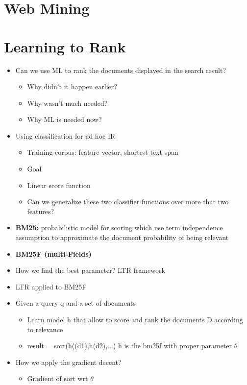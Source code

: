 \chapter{Web Mining}

\chapter{Learning to Rank}
\begin{itemize}
    \item Can we use ML to rank the documents displayed in the search result?
    \begin{itemize}
        \item Why didn't it happen earlier?
        \item Why wasn't much needed?
        \item Why ML is needed now?
    \end{itemize}
    \item Using classification for ad hoc IR
    \begin{itemize}
        \item Training corpus: feature vector, shortest text span
        \item Goal
        \item Linear score function
        \item Can we generalize these two classifier functions over more that two features?
    \end{itemize}
    \item \textbf{BM25:} probabilistic model for scoring which use term independence assumption to approximate the document probability of being relevant
    \item \textbf{BM25F (multi-Fields)}
    \item How we find the best parameter? LTR framework
    \item LTR applied to BM25F
    \item Given a query q and a set of documents
    \begin{itemize}
        \item Learn model h that allow to score and rank the documents D according to relevance
        \item result = sort(h((d1),h(d2),...) h is the bm25f with proper parameter \(\theta\)
    \end{itemize}
    \item How we apply the gradient decent?
    \begin{itemize}
        \item Gradient of sort wrt \(\theta\)

\end{itemize}
\end{itemize}
